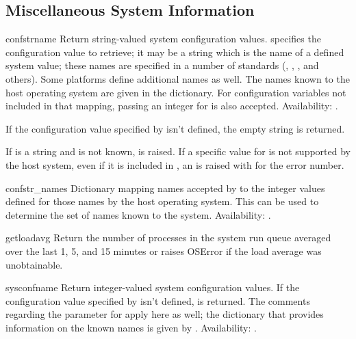 \subsection{Miscellaneous System Information \label{os-path}}


\begin{funcdesc}{confstr}{name}
Return string-valued system configuration values.
 specifies the configuration value to retrieve; it may be a
string which is the name of a defined system value; these names are
specified in a number of standards (\POSIX, , , and
others).  Some platforms define additional names as well.  The names
known to the host operating system are given in the
 dictionary.  For configuration variables not
included in that mapping, passing an integer for  is also
accepted.
Availability: \UNIX.

If the configuration value specified by  isn't defined, the
empty string is returned.

If  is a string and is not known,  is
raised.  If a specific value for  is not supported by the
host system, even if it is included in , an
 is raised with  for the
error number.
\end{funcdesc}

\begin{datadesc}{confstr_names}
Dictionary mapping names accepted by  to the
integer values defined for those names by the host operating system.
This can be used to determine the set of names known to the system.
Availability: \UNIX.
\end{datadesc}

\begin{funcdesc}{getloadavg}{}
Return the number of processes in the system run queue averaged over
the last 1, 5, and 15 minutes or raises OSError if the load average
was unobtainable.

\end{funcdesc}

\begin{funcdesc}{sysconf}{name}
Return integer-valued system configuration values.
If the configuration value specified by  isn't defined,
 is returned.  The comments regarding the 
parameter for  apply here as well; the dictionary
that provides information on the known names is given by
.
Availability: \UNIX.
\end{funcdesc}

